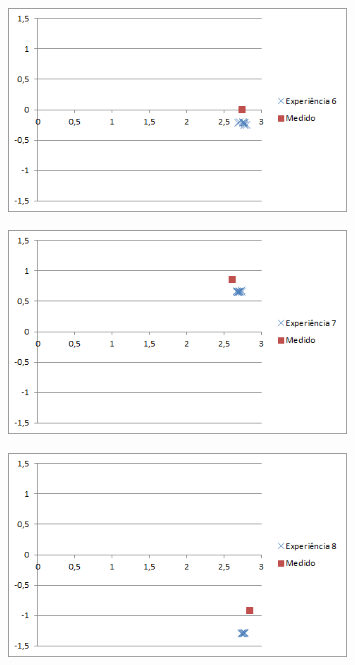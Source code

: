 \begin{figure}
\begin{center}
	\includegraphics[width=0.80\textwidth]{figures/experiencia/pos_chart_exp6.png}
	\label{fig:pos_chart_exp6}
\end{center}
\end{figure}

\begin{figure}
\begin{center}
	\includegraphics[width=0.80\textwidth]{figures/experiencia/pos_chart_exp7.png}
	\label{fig:pos_chart_exp7}
\end{center}
\end{figure}

\begin{figure}
\begin{center}
	\includegraphics[width=0.80\textwidth]{figures/experiencia/pos_chart_exp8.png}
	\label{fig:pos_chart_exp8}
\end{center}
\end{figure}


